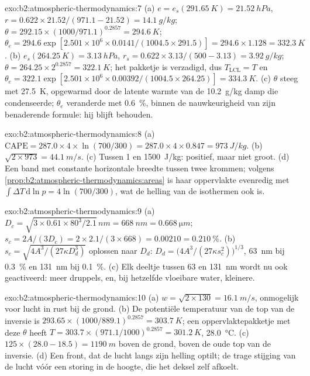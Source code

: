 \begin{solution}{exo:b2:atmospheric-thermodynamics:7}
(a) $e = e_s(\qty{291.65}{K}) = \qty{21.52}{hPa}$, $r = 0.622 \times 21.52/(971.1 - 21.52) =
\qty{14.1}{g/kg}$; $\theta = 292.15 \times (1000/971.1)^{0.2857} = \qty{294.6}{K}$; $\theta_e =
294.6 \exp[2.501 \times 10^6 \times 0.0141/(1004.5 \times 291.5)] = 294.6 \times 1.128 =
\qty{332.3}{K}$. (b) $e_s(\qty{264.25}{K}) = \qty{3.13}{hPa}$, $r_s = 0.622 \times 3.13/(500 -
3.13) = \qty{3.92}{g/kg}$; $\theta = 264.25 \times 2^{0.2857} = \qty{322.1}{K}$; het pakketje is
verzadigd, dus $T_{\text{LCL}} = T$ en $\theta_e = 322.1 \exp[2.501 \times 10^6 \times
0.00392/(1004.5 \times 264.25)] = \qty{334.3}{K}$. (c) $\theta$ steeg met \qty{27.5}{K}, opgewarmd
door de latente warmte van de \qty{10.2}{g/kg} damp die condenseerde; $\theta_e$ veranderde met
\qty{0.6}{\percent}, binnen de nauwkeurigheid van zijn benaderende formule: hij blijft behouden.
\end{solution}

\begin{solution}{exo:b2:atmospheric-thermodynamics:8}
(a) $\text{CAPE} = 287.0 \times 4 \times \ln(700/300) = 287.0 \times 4 \times 0.847 =
\qty{973}{J/kg}$. (b) $\sqrt{2 \times 973} = \qty{44.1}{m/s}$. (c) Tussen 1 en
\qty{1500}{J/kg}: positief, maar niet groot. (d) Een band met constante horizontale breedte tussen twee
krommen; volgens \cref{prop:b2:atmospheric-thermodynamics:areas} is haar oppervlakte evenredig met $\int
\Delta T\,\mathrm{d}\ln p = 4 \ln(700/300)$, wat de helling van de isothermen ook is.
\end{solution}

\begin{solution}{exo:b2:atmospheric-thermodynamics:9}
(a) $D_c = \sqrt{3 \times 0.61 \times 80^3/2.1}\,\unit{nm} = \qty{668}{nm} =
\qty{0.668}{\micro m}$; $s_c = 2A/(3D_c) = 2 \times 2.1/(3 \times 668) = 0.00210 =
\qty{0.210}{\percent}$. (b) $s_c = \sqrt{4A^3/(27\kappa D_d^3)}$ oplossen naar $D_d$: $D_d =
\bigl(4A^3/(27\kappa s_c^2)\bigr)^{1/3}$, \qty{63}{nm} bij \qty{0.3}{\percent} en \qty{131}{nm} bij
\qty{0.1}{\percent}. (c) Elk deeltje tussen 63 en \qty{131}{nm} wordt nu ook geactiveerd: meer
druppels, en, bij hetzelfde vloeibare water, kleinere.
\end{solution}

\begin{solution}{exo:b2:atmospheric-thermodynamics:10}
(a) $w = \sqrt{2 \times 130} = \qty{16.1}{m/s}$, onmogelijk voor lucht in rust bij de grond.
(b) De potentiële temperatuur van de top van de inversie is $293.65 \times (1000/889.1)^{0.2857} =
\qty{303.7}{K}$; een oppervlaktepakketje met deze $\theta$ heeft $T = 303.7 \times (971.1/1000)^{0.2857}
= \qty{301.2}{K}$, \qty{28.0}{\celsius}. (c) $125 \times (28.0 - 18.5) = \qty{1190}{m}$ boven de
grond, boven de oude top van de inversie. (d) Een front, dat de lucht langs zijn helling optilt; de trage stijging
van de lucht vóór een storing in de hoogte, die het deksel zelf afkoelt.
\end{solution}

